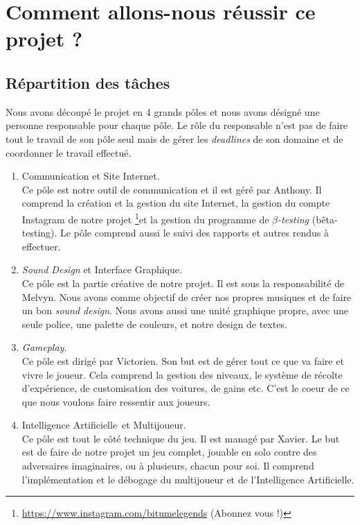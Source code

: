 \documentclass[12pt,a4paper]{article}
\newcommand{\AI}{Intelligence Artificielle}
\begin{document}
\section{Comment allons-nous réussir ce projet ?}
\subsection{Répartition des tâches} 
Nous avons découpé le projet en 4 grands pôles et nous avons désigné une personne responsable
pour chaque pôle. Le rôle du responsable n'est pas de faire tout le travail de son pôle seul mais
de gérer les \textit{deadlines} de son domaine et de coordonner le travail effectué.\\
\begin{enumerate}
    \item Communication et Site Internet.\\
        Ce pôle est notre outil de communication et il est géré par Anthony. Il comprend la création
        et la gestion du site Internet, la gestion du compte Instagram de notre projet \footnote{\url{https://www.instagram.com/bitumelegends} (Abonnez vous !)}et la
        gestion du programme de \(\beta\)\textit{-testing} (bêta-testing). Le pôle comprend aussi le suivi
        des rapports et autres rendus à effectuer.
        \\
    \item \textit{Sound Design} et Interface Graphique.\\
        Ce pôle est la partie créative de notre projet. Il est sous la responsabilité de Melvyn.
        Nous avons comme objectif de créer nos propres musiques et de faire un bon \textit{sound design}.
        Nous avons aussi une unité graphique propre, avec une seule police, une palette de couleurs, et notre
        design de textes.
        \\
    \item \textit{Gameplay}.\\
        Ce pôle est dirigé par Victorien.
        Son but est de gérer tout ce que va faire et vivre le joueur. Cela comprend la gestion des niveaux,
        le système de récolte d'expérience, de customisation des voitures, de gains etc. C'est le coeur 
        de ce que nous voulons faire ressentir aux joueurs.
        \\
    \item \AI\, et Multijoueur.\\
        Ce pôle est tout le côté technique du jeu. Il est managé par Xavier. Le but est de faire de notre projet
        un jeu complet, jouable en solo contre des adversaires imaginaires, ou à plusieurs, chacun pour soi. Il 
        comprend l'implémentation et le débogage du multijoueur et de l'\AI.
\end{enumerate}
\clearpage
\end{document}
